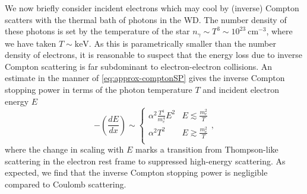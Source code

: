 \documentclass[twocolumn,showpacs,preprintnumbers,amsmath,amssymb,prd]{revtex4}
\newcommand{\cm}{\text{cm}}
\def\r{\right)}
\def\l{\left(}
\begin{document}
\begin{appendices}
We now briefly consider incident electrons which may cool by (inverse) Compton scatters with the thermal bath of photons in the WD.  
The number density of these photons is set by the temperature of the star $n_\gamma \sim T^3 \sim 10^{23} ~\cm^{-3}$, where we have taken $T \sim \text{keV}$. 
As this is parametrically smaller than the number density of electrons, it is reasonable to suspect that the energy loss due to inverse Compton scattering is far subdominant to electron-electron collisions.
An estimate in the manner of \eqref{eq:approx-comptonSP} gives the inverse Compton stopping power in terms of the photon temperature $T$ and incident electron energy $E$ 
\begin{equation}
\label{eq:invcomptonSP}
  -\l \frac{dE}{dx}\r \sim 
  \begin{cases}
    \alpha^2 \frac{T^4}{m_e^4} E^2 & E \lesssim \frac{m_e^2}{T} \\
    \alpha^2 T^2 & E \gtrsim \frac{m_e^2}{T} \\
  \end{cases},
\end{equation}
where the change in scaling with $E$ marks a transition from Thompson-like scattering in the electron rest frame to suppressed high-energy scattering.
As expected, we find that the inverse Compton stopping power is negligible compared to Coulomb scattering. 


\end{appendices}
\end{document}
